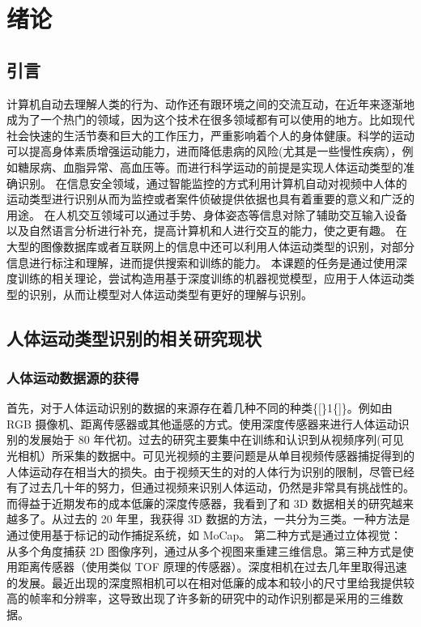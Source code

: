 \section{绪论}\label{ux7eeaux8bba}

\subsection{引言}\label{ux5f15ux8a00}

计算机自动去理解人类的行为、动作还有跟环境之间的交流互动，在近年来逐渐地成为了一个热门的领域，因为这个技术在很多领域都有可以使用的地方。比如现代社会快速的生活节奏和巨大的工作压力，严重影响着个人的身体健康。科学的运动可以提高身体素质增强运动能力，进而降低患病的风险(尤其是一些慢性疾病），例如糖尿病、血脂异常、高血压等。而进行科学运动的前提是实现人体运动类型的准确识别。
在信息安全领域，通过智能监控的方式利用计算机自动对视频中人体的运动类型进行识别从而为监控或者案件侦破提供依据也具有着重要的意义和广泛的用途。
在人机交互领域可以通过手势、身体姿态等信息对除了辅助交互输入设备以及自然语言分析进行补充，提高计算机和人进行交互的能力，使之更有趣。
在大型的图像数据库或者互联网上的信息中还可以利用人体运动类型的识别，对部分信息进行标注和理解，进而提供搜索和训练的能力。
本课题的任务是通过使用深度训练的相关理论，尝试构造用基于深度训练的机器视觉模型，应用于人体运动类型的识别，从而让模型对人体运动类型有更好的理解与识别。

\subsection{人体运动类型识别的相关研究现状}\label{ux4ebaux4f53ux8fd0ux52a8ux7c7bux578bux8bc6ux522bux7684ux76f8ux5173ux7814ux7a76ux73b0ux72b6}

\subsubsection{人体运动数据源的获得}\label{ux4ebaux4f53ux8fd0ux52a8ux6570ux636eux6e90ux7684ux83b7ux5f97}

首先，对于人体运动识别的数据的来源存在着几种不同的种类\{{[}\}1\{{]}\}。例如由
RGB
摄像机、距离传感器或其他遥感的方式。使用深度传感器来进行人体运动识别的发展始于
80
年代初。过去的研究主要集中在训练和认识到从视频序列(可见光相机）所采集的数据中。可见光视频的主要问题是从单目视频传感器捕捉得到的人体运动存在相当大的损失。由于视频天生的对的人体行为识别的限制，尽管已经有了过去几十年的努力，但通过视频来识别人体运动，仍然是非常具有挑战性的。
而得益于近期发布的成本低廉的深度传感器，我看到了和 3D
数据相关的研究越来越多了。从过去的 20 年里，我获得 3D
数据的方法，一共分为三类。一种方法是通过使用基于标记的动作捕捉系统，如
MoCap。 第二种方式是通过立体视觉： 从多个角度捕获 2D
图像序列，通过从多个视图来重建三维信息。第三种方式是使用距离传感器（使用类似
TOF
原理的传感器）。深度相机在过去几年里取得迅速的发展。最近出现的深度照相机可以在相对低廉的成本和较小的尺寸里给我提供较高的帧率和分辨率，这导致出现了许多新的研究中的动作识别都是采用的三维数据。

